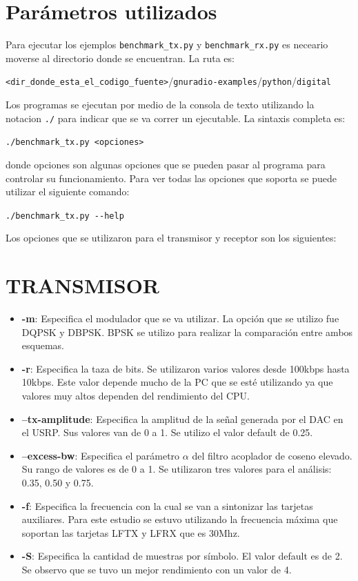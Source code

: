 \section{Par\'ametros utilizados}
\label{sec:params}

Para ejecutar los ejemplos \verb|benchmark_tx.py| y \verb|benchmark_rx.py| es neceario moverse al
directorio donde se encuentran. La ruta es:
\begin{center}
\verb|<dir_donde_esta_el_codigo_fuente>|/\verb|gnuradio-examples|/\verb|python|/\verb|digital|
\end{center}
Los programas se ejecutan por medio de la consola de texto utilizando la notacion \verb|./| para
indicar que se va correr un ejecutable. La sintaxis completa es:
\begin{center}
\verb|./benchmark_tx.py <opciones>|
\end{center}
donde opciones son algunas opciones que se pueden pasar al programa para controlar su
funcionamiento. Para ver todas las opciones que soporta se puede utilizar el siguiente comando:
\begin{center}
\verb|./benchmark_tx.py --help|
\end{center}

Los opciones que se utilizaron para el transmisor y receptor son los siguientes:

\section*{TRANSMISOR}
\begin{itemize}
  \item \textbf{-m}: Especifica el modulador que se va utilizar. La opci\'on que se utilizo fue
  DQPSK y DBPSK. BPSK se utilizo para realizar la comparaci\'on entre ambos esquemas.
  \item \textbf{-r}: Especifica la taza de bits. Se utilizaron varios valores desde 100kbps hasta
  10kbps. Este valor depende mucho de la PC que se est\'e utilizando ya que valores muy altos
  dependen del rendimiento del CPU.
  \item \textbf{--tx-amplitude}: Especifica la amplitud de la se\~nal generada por el DAC en el
  USRP. Sus valores van de 0 a 1. Se utilizo el valor default de 0.25.
  \item \textbf{--excess-bw}: Especifica el par\'ametro $\alpha$ del filtro acoplador de coseno
  elevado. Su rango de valores es de 0 a 1. Se utilizaron tres valores para el an\'alisis: 0.35,
  0.50 y 0.75.
  \item \textbf{-f}: Especifica la frecuencia con la cual se van a sintonizar las tarjetas
  auxiliares. Para este estudio se estuvo utilizando la frecuencia m\'axima que soportan las
  tarjetas LFTX y LFRX que es 30Mhz.
  \item \textbf{-S}: Especifica la cantidad de muestras por s\'imbolo. El valor default es de 2. Se
  observo que se tuvo un mejor rendimiento con un valor de 4.
\end{itemize}

